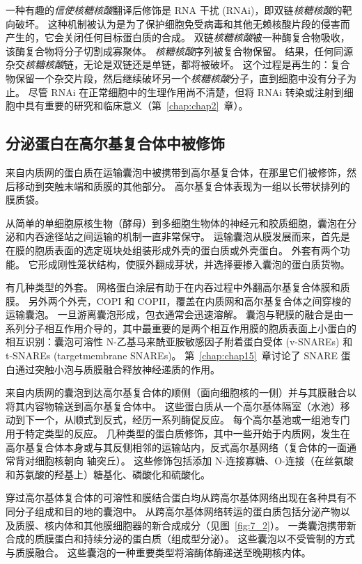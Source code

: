 一种有趣的\textit{信使核糖核酸}翻译后修饰是 RNA 干扰 (RNAi)，即双链\textit{核糖核酸}的靶向破坏。
这种机制被认为是为了保护细胞免受病毒和其他无赖核酸片段的侵害而产生的，它会关闭任何目标蛋白质的合成。 
双链\textit{核糖核酸}被一种酶复合物吸收，该酶复合物将分子切割成寡聚体。
\textit{核糖核酸}序列被复合物保留。
结果，任何同源杂交\textit{核糖核酸}链，无论是双链还是单链，都将被破坏。
这个过程是再生的：复合物保留一个杂交片段，然后继续破坏另一个\textit{核糖核酸}分子，直到细胞中没有分子为止。
尽管 RNAi 在正常细胞中的生理作用尚不清楚，但将 RNAi 转染或注射到细胞中具有重要的研究和临床意义（第~\ref{chap:chap2}~章）。



\subsection{分泌蛋白在高尔基复合体中被修饰}

来自内质网的蛋白质在运输囊泡中被携带到高尔基复合体，在那里它们被修饰，然后移动到突触末端和质膜的其他部分。
高尔基复合体表现为一组以长带状排列的膜质袋。


从简单的单细胞原核生物（酵母）到多细胞生物体的神经元和胶质细胞，囊泡在分泌和内吞途径站之间运输的机制一直非常保守。
运输囊泡从膜发展而来，首先是在膜的胞质表面的选定斑块处组装形成外壳的蛋白质或外壳蛋白。
外套有两个功能。
它形成刚性笼状结构，使膜外翻成芽状，并选择要掺入囊泡的蛋白质货物。


有几种类型的外套。
网格蛋白涂层有助于在内吞过程中外翻高尔基复合体膜和质膜。
另外两个外壳，COPI 和 COPII，覆盖在内质网和高尔基复合体之间穿梭的运输囊泡。
一旦游离囊泡形成，包衣通常会迅速溶解。
囊泡与靶膜的融合是由一系列分子相互作用介导的，其中最重要的是两个相互作用膜的胞质表面上小蛋白的相互识别：囊泡可溶性 N-乙基马来酰亚胺敏感因子附着蛋白受体 (v-SNAREs) 和 t-SNAREs (targetmembrane SNAREs)。
第~\ref{chap:chap15}~章讨论了 SNARE 蛋白通过突触小泡与质膜融合释放神经递质的作用。


来自内质网的囊泡到达高尔基复合体的顺侧（面向细胞核的一侧）并与其膜融合以将其内容物输送到高尔基复合体中。
这些蛋白质从一个高尔基体隔室（水池）移动到下一个，从顺式到反式，经历一系列酶促反应。
每个高尔基池或一组池专门用于特定类型的反应。
几种类型的蛋白质修饰，其中一些开始于内质网，发生在高尔基复合体本身或与其反侧相邻的运输站内，反式高尔基网络（复合体的一面通常背对细胞核朝向 轴突丘）。
这些修饰包括添加 N-连接寡糖、O-连接（在丝氨酸和苏氨酸的羟基上）糖基化、磷酸化和硫酸化。


穿过高尔基体复合体的可溶性和膜结合蛋白均从跨高尔基体网络出现在各种具有不同分子组成和目的地的囊泡中。 
从跨高尔基体网络转运的蛋白质包括分泌产物以及质膜、核内体和其他膜细胞器的新合成成分（见图~\ref{fig:7_2}）。
一类囊泡携带新合成的质膜蛋白和持续分泌的蛋白质（组成型分泌）。
这些囊泡以不受管制的方式与质膜融合。
这些囊泡的一种重要类型将溶酶体酶递送至晚期核内体。


